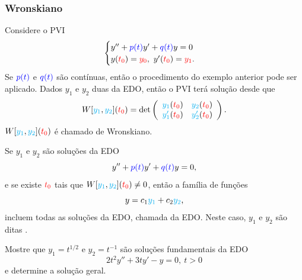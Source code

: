 \begin{frame}
\frametitle{Wronskiano}
Considere o PVI
\[
\begin{cases}
y''+{\color{blue}p(t)}y'+{\color{blue}q(t)}y=0\\
y({\color{red}t_0})= {\color{red}y_0},\  y'({\color{red}t_0})={\color{red}y_1}.
\end{cases}
\]
Se ${\color{blue}p(t)}$ e ${\color{blue}q(t)}$ são contínuas, então o procedimento do exemplo anterior pode ser aplicado. Dados {\color{cyan} $y_1$} e {\color{cyan} $y_2$} duas da EDO, então o PVI terá solução desde que 
\[W[{\color{cyan} y_1},{\color{cyan} y_2}]({\color{red}t_0})=
\det\left( \begin{array}{cc}
 {\color{cyan} y_1}({\color{red}t_0}) & {\color{cyan} y_2}({\color{red}t_0})  \\
{\color{cyan} y_1^\prime}({\color{red}t_0}) & {\color{cyan} y_2^\prime}({\color{red}t_0})
\end{array}
\right).\]
$W[{\color{cyan} y_1},{\color{cyan} y_2}]({\color{red}t_0})$ é chamado de {\color{blue} Wronskiano}. 


\end{frame}



\begin{frame}
\begin{teo}
Se {\color{cyan} $y_1$} e {\color{cyan} $y_2$} são soluções da EDO 
\[y''+{\color{blue}p(t)}y'+{\color{blue}q(t)}y=0,\]
e se existe ${\color{red}t_0}$ tais que $W[{\color{cyan} y_1},{\color{cyan} y_2}]({\color{red}t_0})\neq 0$, então a família de funções
\[y=c_1{\color{cyan} y_1}+c_2{\color{cyan} y_2},\]
incluem todas as soluções da EDO, chamada  da EDO. Neste caso, {\color{cyan} $y_1$} e {\color{cyan} $y_2$} são ditas .
\end{teo}

\begin{exe}
Mostre que $y_1=t^{1/2}$ e $y_2=t^{-1}$ são soluções fundamentais da EDO
\[2t^2y''+3ty'-y=0,\ t>0\]
e determine a solução geral.
\end{exe}
\end{frame}




